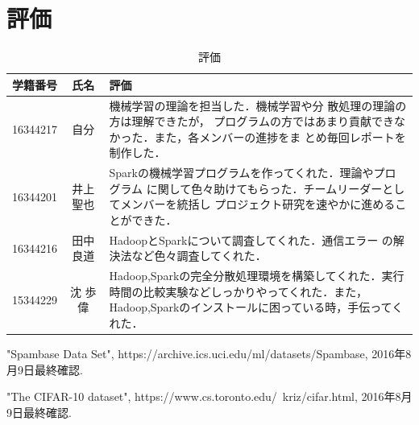 \documentclass[a4paper,12pt]{jarticle}
\begin{document}
\section{評価}
\begin{table}[hbtp]
\centering
\caption{評価}
\label{tab:評価}
\fontsize{9pt}{10pt}\selectfont
\begin{tabular}{c|c||p{100mm}} \hline
 学籍番号&氏名     &評価   \\ \hline \hline
 16344217&自分& 機械学習の理論を担当した．機械学習や分
		 散処理の理論の方は理解できたが，
		 プログラムの方ではあまり貢献できなかった．また，各メンバーの進捗をま
		 とめ毎回レポートを制作した．\\ \hline
16344201&井上 聖也&Sparkの機械学習プログラムを作ってくれた．理論やプログラム
		 に関して色々助けてもらった．チームリーダーとしてメンバーを統括し
		 プロジェクト研究を速やかに進めることができた．\\ \hline
16344216&田中 良道& HadoopとSparkについて調査してくれた．通信エラー
		 の解決法など色々調査してくれた．\\ \hline 
15344229&沈 歩偉　& Hadoop,Sparkの完全分散処理環境を構築してくれた．実行
		 時間の比較実験などしっかりやってくれた．また，
		 Hadoop,Sparkのインストールに困っている時，手伝ってくれた． \\ \hline
\end{tabular}
\end{table}
\begin{thebibliography}{99}

  "Spambase Data Set",
		 https://archive.ics.uci.edu/ml/datasets/Spambase, 2016年8月9日最終確認.

  "The CIFAR-10 dataset",
		 https://www.cs.toronto.edu/~kriz/cifar.html, 2016年8月9日最終確認.

\end{thebibliography}
\end{document}
